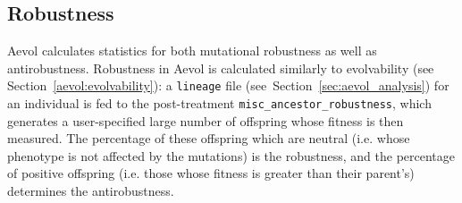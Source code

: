 \subsection{Robustness}
Aevol calculates statistics for both mutational robustness as well as antirobustness. Robustness in Aevol is calculated similarly to evolvability (see Section~\ref{aevol:evolvability}): a \texttt{lineage} file (see~Section~\ref{sec:aevol_analysis}) for an individual is fed to the post-treatment \texttt{misc\_ancestor\_robustness}, which generates a user-specified large number of offspring whose fitness is then measured. The percentage of these offspring which are neutral (i.e. whose phenotype is not affected by the mutations) is the robustness, and the percentage of positive offspring (i.e. those whose fitness is greater than their parent's) determines the antirobustness.

